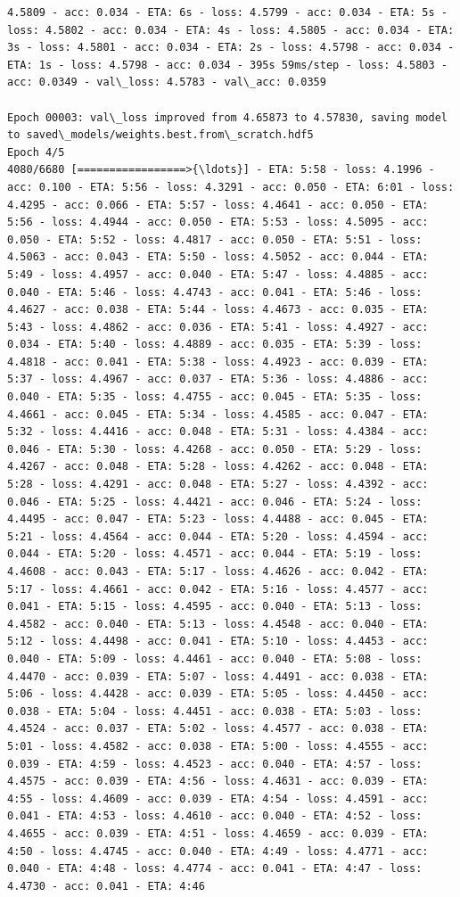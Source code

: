 \documentclass[11pt]{article}
\begin{document}
\begin{Verbatim}[commandchars=\\\{\}]
4.5809 - acc: 0.034 - ETA: 6s - loss: 4.5799 - acc: 0.034 - ETA: 5s - loss: 4.5802 - acc: 0.034 - ETA: 4s - loss: 4.5805 - acc: 0.034 - ETA: 3s - loss: 4.5801 - acc: 0.034 - ETA: 2s - loss: 4.5798 - acc: 0.034 - ETA: 1s - loss: 4.5798 - acc: 0.034 - 395s 59ms/step - loss: 4.5803 - acc: 0.0349 - val\_loss: 4.5783 - val\_acc: 0.0359

Epoch 00003: val\_loss improved from 4.65873 to 4.57830, saving model to saved\_models/weights.best.from\_scratch.hdf5
Epoch 4/5
4080/6680 [=================>{\ldots}] - ETA: 5:58 - loss: 4.1996 - acc: 0.100 - ETA: 5:56 - loss: 4.3291 - acc: 0.050 - ETA: 6:01 - loss: 4.4295 - acc: 0.066 - ETA: 5:57 - loss: 4.4641 - acc: 0.050 - ETA: 5:56 - loss: 4.4944 - acc: 0.050 - ETA: 5:53 - loss: 4.5095 - acc: 0.050 - ETA: 5:52 - loss: 4.4817 - acc: 0.050 - ETA: 5:51 - loss: 4.5063 - acc: 0.043 - ETA: 5:50 - loss: 4.5052 - acc: 0.044 - ETA: 5:49 - loss: 4.4957 - acc: 0.040 - ETA: 5:47 - loss: 4.4885 - acc: 0.040 - ETA: 5:46 - loss: 4.4743 - acc: 0.041 - ETA: 5:46 - loss: 4.4627 - acc: 0.038 - ETA: 5:44 - loss: 4.4673 - acc: 0.035 - ETA: 5:43 - loss: 4.4862 - acc: 0.036 - ETA: 5:41 - loss: 4.4927 - acc: 0.034 - ETA: 5:40 - loss: 4.4889 - acc: 0.035 - ETA: 5:39 - loss: 4.4818 - acc: 0.041 - ETA: 5:38 - loss: 4.4923 - acc: 0.039 - ETA: 5:37 - loss: 4.4967 - acc: 0.037 - ETA: 5:36 - loss: 4.4886 - acc: 0.040 - ETA: 5:35 - loss: 4.4755 - acc: 0.045 - ETA: 5:35 - loss: 4.4661 - acc: 0.045 - ETA: 5:34 - loss: 4.4585 - acc: 0.047 - ETA: 5:32 - loss: 4.4416 - acc: 0.048 - ETA: 5:31 - loss: 4.4384 - acc: 0.046 - ETA: 5:30 - loss: 4.4268 - acc: 0.050 - ETA: 5:29 - loss: 4.4267 - acc: 0.048 - ETA: 5:28 - loss: 4.4262 - acc: 0.048 - ETA: 5:28 - loss: 4.4291 - acc: 0.048 - ETA: 5:27 - loss: 4.4392 - acc: 0.046 - ETA: 5:25 - loss: 4.4421 - acc: 0.046 - ETA: 5:24 - loss: 4.4495 - acc: 0.047 - ETA: 5:23 - loss: 4.4488 - acc: 0.045 - ETA: 5:21 - loss: 4.4564 - acc: 0.044 - ETA: 5:20 - loss: 4.4594 - acc: 0.044 - ETA: 5:20 - loss: 4.4571 - acc: 0.044 - ETA: 5:19 - loss: 4.4608 - acc: 0.043 - ETA: 5:17 - loss: 4.4626 - acc: 0.042 - ETA: 5:17 - loss: 4.4661 - acc: 0.042 - ETA: 5:16 - loss: 4.4577 - acc: 0.041 - ETA: 5:15 - loss: 4.4595 - acc: 0.040 - ETA: 5:13 - loss: 4.4582 - acc: 0.040 - ETA: 5:13 - loss: 4.4548 - acc: 0.040 - ETA: 5:12 - loss: 4.4498 - acc: 0.041 - ETA: 5:10 - loss: 4.4453 - acc: 0.040 - ETA: 5:09 - loss: 4.4461 - acc: 0.040 - ETA: 5:08 - loss: 4.4470 - acc: 0.039 - ETA: 5:07 - loss: 4.4491 - acc: 0.038 - ETA: 5:06 - loss: 4.4428 - acc: 0.039 - ETA: 5:05 - loss: 4.4450 - acc: 0.038 - ETA: 5:04 - loss: 4.4451 - acc: 0.038 - ETA: 5:03 - loss: 4.4524 - acc: 0.037 - ETA: 5:02 - loss: 4.4577 - acc: 0.038 - ETA: 5:01 - loss: 4.4582 - acc: 0.038 - ETA: 5:00 - loss: 4.4555 - acc: 0.039 - ETA: 4:59 - loss: 4.4523 - acc: 0.040 - ETA: 4:57 - loss: 4.4575 - acc: 0.039 - ETA: 4:56 - loss: 4.4631 - acc: 0.039 - ETA: 4:55 - loss: 4.4609 - acc: 0.039 - ETA: 4:54 - loss: 4.4591 - acc: 0.041 - ETA: 4:53 - loss: 4.4610 - acc: 0.040 - ETA: 4:52 - loss: 4.4655 - acc: 0.039 - ETA: 4:51 - loss: 4.4659 - acc: 0.039 - ETA: 4:50 - loss: 4.4745 - acc: 0.040 - ETA: 4:49 - loss: 4.4771 - acc: 0.040 - ETA: 4:48 - loss: 4.4774 - acc: 0.041 - ETA: 4:47 - loss: 4.4730 - acc: 0.041 - ETA: 4:46 
\end{Verbatim}
\end{document}
